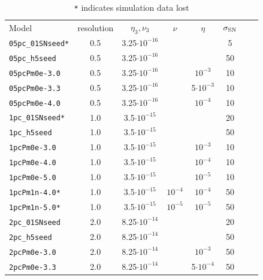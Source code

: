 \documentclass[preprint2]{aastex63}
\begin{document}
\begin{table}
\caption{\texttt{*} indicates simulation data lost}
\begin{tabular}{lccccccc}
Model & resolution & $\eta_3,\nu_3$ & $\nu$ & $\eta$ & $\sigma_{\rm SN}$ & \\
\texttt{05pc\_01SNseed*} & 0.5 & 3.25$\cdot10^{-16}$ &                  &                 &  5   \\
\texttt{05pc\_h5seed  }  & 0.5 & 3.25$\cdot10^{-16}$ &                  &                 &  50  \\
\texttt{05pcPm0e-3.0 }   & 0.5 & 3.25$\cdot10^{-16}$ &                  & $     10^{-3}$  &  10  \\
\texttt{05pcPm0e-3.3 }   & 0.5 & 3.25$\cdot10^{-16}$ &                  & 5$\cdot10^{-3}$ &  10  \\
\texttt{05pcPm0e-4.0 }   & 0.5 & 3.25$\cdot10^{-16}$ &                  & $     10^{-4}$  &  10  \\
\texttt{1pc\_01SNseed*}  & 1.0 & 3.5$\cdot10^{-15}$  &                  &                 &  20  \\
\texttt{1pc\_h5seed   }  & 1.0 & 3.5$\cdot10^{-15}$  &                  &                 &  50  \\
\texttt{1pcPm0e-3.0  }   & 1.0 & 3.5$\cdot10^{-15}$  &                  & $     10^{-3}$  &  10  \\
\texttt{1pcPm0e-4.0  }   & 1.0 & 3.5$\cdot10^{-15}$  &                  & $     10^{-4}$  &  10  \\
\texttt{1pcPm0e-5.0  }   & 1.0 & 3.5$\cdot10^{-15}$  &                  & $     10^{-5}$  &  10  \\
\texttt{1pcPm1n-4.0* }   & 1.0 & 3.5$\cdot10^{-15}$  & $     10^{-4}$   & $     10^{-4}$  &  50  \\
\texttt{1pcPm1n-5.0* }   & 1.0 & 3.5$\cdot10^{-15}$  & $     10^{-5}$   & $     10^{-5}$  &  50  \\
\texttt{2pc\_01SNseed }  & 2.0 & 8.25$\cdot10^{-14}$ &                  &                 &  20  \\
\texttt{2pc\_h5seed   }  & 2.0 & 8.25$\cdot10^{-14}$ &                  &                 &  50  \\
\texttt{2pcPm0e-3.0  }   & 2.0 & 8.25$\cdot10^{-14}$ &                  & $     10^{-3}$  &  50  \\
\texttt{2pcPm0e-3.3  }   & 2.0 & 8.25$\cdot10^{-14}$ &                  & 5$\cdot10^{-4}$ &  50  \\

\end{tabular}
\end{table}
\end{document}
